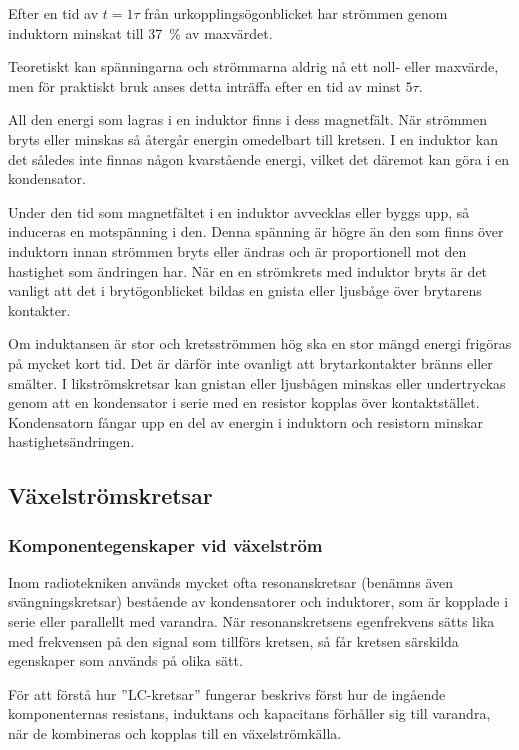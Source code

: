Efter en tid av \(t = 1\tau\) från urkopplingsögonblicket har strömmen genom
induktorn minskat till 37~\% av maxvärdet.

Teoretiskt kan spänningarna och strömmarna aldrig nå ett noll- eller maxvärde,
men för praktiskt bruk anses detta inträffa efter en tid av minst \(5\tau\).

All den energi som lagras i en induktor finns i dess magnetfält.
När strömmen bryts eller minskas så återgår energin omedelbart till kretsen.
I en induktor kan det således inte finnas någon kvarstående energi, vilket
det däremot kan göra i en kondensator.

Under den tid som magnetfältet i en induktor avvecklas eller byggs upp, så
induceras en motspänning i den.
Denna spänning är högre än den som finns över induktorn innan strömmen bryts
eller ändras och är proportionell mot den hastighet som ändringen har.
När en en strömkrets med induktor bryts är det vanligt att det i brytögonblicket
bildas en gnista eller ljusbåge över brytarens kontakter.

Om induktansen är stor och kretsströmmen hög ska en stor mängd energi frigöras på mycket kort tid.
Det är därför inte ovanligt att brytarkontakter bränns eller smälter.
I likströmskretsar kan gnistan eller ljusbågen minskas eller undertryckas genom
att en kondensator i serie med en resistor kopplas över kontaktstället.
Kondensatorn fångar upp en del av energin i induktorn och resistorn minskar hastighetsändringen.

\subsection{Växelströmskretsar}

\subsubsection{Komponentegenskaper vid växelström}

Inom radiotekniken används mycket ofta resonanskretsar (benämns även
svängningskretsar) bestående av kondensatorer och induktorer, som är kopplade i
serie eller parallellt med varandra.
När resonanskretsens egenfrekvens sätts lika med frekvensen på den signal som
tillförs kretsen, så får kretsen särskilda egenskaper som används på olika sätt.

För att förstå hur ''LC-kretsar'' fungerar beskrivs först hur de ingående
komponenternas resistans, induktans och kapacitans förhåller sig till varandra,
när de kombineras och kopplas till en växelströmkälla.

